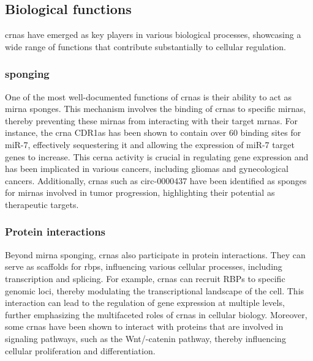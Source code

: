 \subsection{Biological functions}
\label{sec:circrna_functions}
\glspl{crna} have emerged as key players in various biological processes,
showcasing
a wide range of functions that contribute substantially to cellular regulation.

\subsubsection{ sponging}
\label{sec:circrna_mirna_sponging}
One of the most well-documented functions of \glspl{crna} is their ability to
act as \gls{mirna} sponges.
This mechanism involves the binding of \glspl{crna} to specific \glspl{mirna},
thereby preventing these \glspl{mirna} from interacting with their target
\glspl{mrna}.
For instance, the \gls{crna} CDR1as has been shown to contain over 60 binding
sites for miR-7, effectively sequestering it and allowing the expression of
miR-7 target genes to
increase\supercite{guo_expanded_2014,yuan_regulatory_2020}.
This \gls{cerna} activity is crucial in regulating gene expression and has been
implicated in various cancers, including gliomas and gynecological
cancers\supercite{dong_expression_2020,song_circular_2016}.
Additionally, \glspl{crna} such as circ-0000437 have been identified as sponges
for \glspl{mirna} involved in tumor progression, highlighting their potential
as therapeutic targets\supercite{li_peptide_2021,cui_circular_2022}.

\subsubsection{Protein interactions}
Beyond \gls{mirna} sponging, \glspl{crna} also participate in protein
interactions.
They can serve as scaffolds for \glspl{rbp}, influencing various cellular
processes, including transcription and
splicing\supercite{li_comprehensive_2017,qu_emerging_2017}.
For example, \glspl{crna} can recruit RBPs to specific genomic loci, thereby
modulating the transcriptional landscape of the
cell\supercite{li_comprehensive_2017}.
This interaction can lead to the regulation of gene expression at multiple
levels, further emphasizing the multifaceted roles of \glspl{crna} in cellular
biology\supercite{zhang_important_2024,he_targeting_2021}.
Moreover, some \glspl{crna} have been shown to interact with proteins that are
involved in signaling pathways, such as the Wnt/\textbeta{}-catenin pathway,
thereby influencing cellular proliferation and
differentiation\supercite{peng_novel_2021}.

